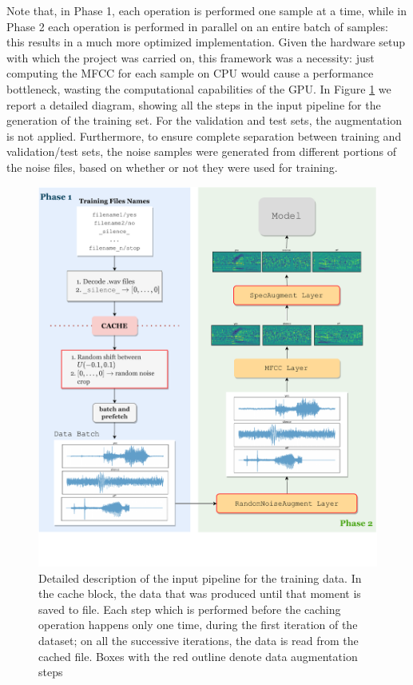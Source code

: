 Note that, in Phase 1, each operation is performed one sample at a time, while in Phase 2 each operation is performed in parallel on an entire batch of samples: this results in a much more optimized implementation. Given the hardware setup with which the project was carried on, this framework was a necessity: just computing the MFCC for each sample on CPU would cause a performance bottleneck, wasting the computational capabilities of the GPU. In Figure \ref{fig:inputpipeline} we report a detailed diagram, showing all the steps in the input pipeline for the generation of the training set. For the validation and test sets, the augmentation is not applied. Furthermore, to ensure complete separation between training and validation/test sets, the noise samples were generated from different portions of the noise files, based on whether or not they were used for training.

\begin{figure}
	\centering
	\includegraphics[width=0.99\linewidth]{imgs/input_pipeline_v3.pdf}
	\caption{Detailed description of the input pipeline for the training data. In the cache block, the data that was produced until that moment is saved to file. Each step which is performed before the caching operation happens only one time, during the first iteration of the dataset; on all the successive iterations, the data is read from the cached file. Boxes with the red outline denote data augmentation steps}
	\label{fig:inputpipeline}
\end{figure}






